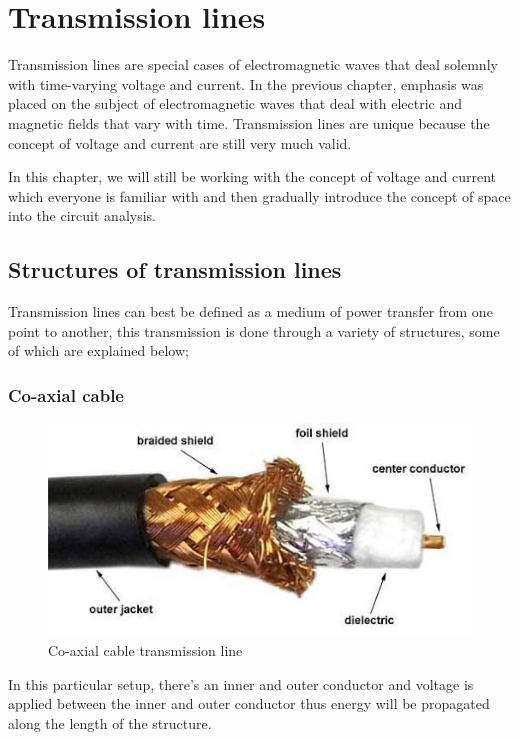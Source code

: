 \chapter{Transmission lines}
Transmission lines are special cases of electromagnetic waves that deal solemnly with time-varying voltage and current. In the previous chapter, emphasis was placed on the subject of electromagnetic waves that deal with electric and magnetic fields that vary with time. Transmission lines are unique because the concept of voltage and current are still very much valid.

In this chapter, we will still be working with the concept of voltage and current which everyone is familiar with and then gradually introduce the concept of space into the circuit analysis. 

\section{Structures of transmission lines}
Transmission lines can best be defined as a medium of power transfer from one point to another, this transmission is done through a variety of structures, some of which are explained below;

\subsection{Co-axial cable}	
\begin{figure}[h]
\centering
\includegraphics[scale=0.65]{./graphics/coaxial}
\caption{Co-axial cable transmission line}
\end{figure}
 In this particular setup, there’s an inner and outer conductor and voltage is applied between the inner and outer conductor thus energy will be propagated along the length of the structure.
